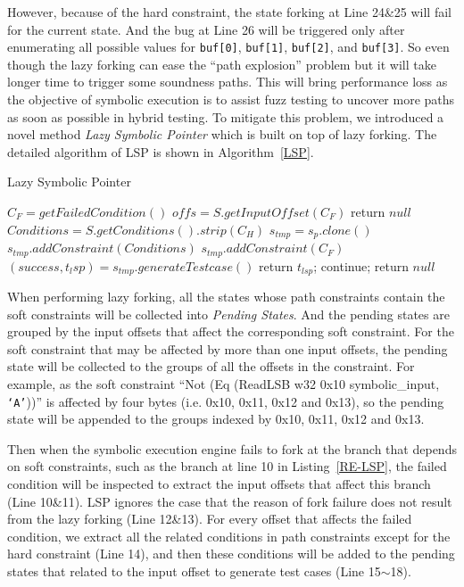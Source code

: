 However, because of the hard constraint, the state forking at Line 24\&25 will fail for the current state. And the bug at Line 26 will be triggered only after enumerating all possible values for \texttt{buf[0]}, \texttt{buf[1]}, \texttt{buf[2]}, and \texttt{buf[3]}. So even though the lazy forking can ease the ``path explosion'' problem but it will take longer time to trigger some soundness paths. This will bring performance loss as the objective of symbolic execution is to assist fuzz testing to uncover more paths as soon as possible in hybrid testing. 
To mitigate this problem, we introduced a novel method \emph{Lazy Symbolic Pointer} which is built on top of lazy forking. The detailed algorithm of LSP is shown in Algorithm~\ref{LSP}.

\begin{algorithm}
  \caption{Lazy Symbolic Pointer}
  \label{LSP}
  $C_F = getFailedCondition()$\;
  $offs = S.getInputOffset(C_F)$\;
  {
    return $null$\;
  }
  $Conditions = S.getConditions().strip(C_H)$\;
  {
    $s_{tmp} = s_p.clone()$\;
    $s_{tmp}.addConstraint(Conditions)$\;
    $s_{tmp}.addConstraint(C_F)$\;
    $(success, t_lsp) = s_{tmp}.generateTestcase()$\;
    {
      return $t_{lsp}$;
    } {
      continue;
    }
  }
  return $null$\;
\end{algorithm}
  
When performing lazy forking, all the states whose path constraints contain the soft constraints will be collected into \emph{Pending States}. And the pending states are grouped by the input offsets that affect the corresponding soft constraint. For the soft constraint that may be affected by more than one input offsets, the pending state will be collected to the groups of all the offsets in the constraint. For example, as the soft constraint ``Not (Eq (ReadLSB w32 0x10 symbolic\_input, \texttt{`A'}))'' is affected by four bytes (i.e. 0x10, 0x11, 0x12 and 0x13), so the pending state will be appended to the groups indexed by 0x10, 0x11, 0x12 and 0x13. 

Then when the symbolic execution engine fails to fork at the branch that depends on soft constraints, such as the branch at line 10 in Listing~\ref{RE-LSP}, the failed condition will be inspected to extract the input offsets that affect this branch (Line 10\&11). LSP ignores the case that the reason of fork failure does not result from the lazy forking (Line 12\&13). For every offset that affects the failed condition, we extract all the related conditions in path constraints except for the hard constraint (Line 14), and then these conditions will be added to the pending states that related to the input offset to generate test cases (Line 15$\sim$18). 

